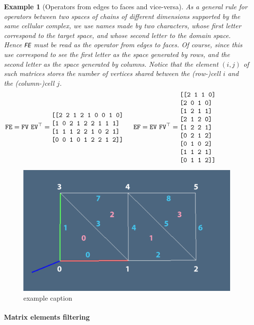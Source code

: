 \documentclass[11pt,oneside]{article}    %
\newtheorem{example}{Example}
\begin{document}
\begin{example}[Operators from edges to faces and vice-versa]\label{ex:denseMat}
As a general rule for operators between two spaces of chains of different dimensions supported by the \emph{same} cellular complex, we use names made by two characters, whose first letter correspond to the target space, and whose second letter to the domain space. Hence \texttt{FE} must be read as the operator from edges to faces. Of course, since this use correspond to see the first letter as the space generated by rows, and the second letter as the space generated by columns. Notice that the element $(i,j)$ of such matrices stores the number of vertices shared between the (row-)cell $i$ and the (column-)cell $j$.
\[
\texttt{FE} = \texttt{FV}\ \texttt{EV}^\top = 
\begin{minipage}[c]{0.29\linewidth}
\begin{verbatim}
[[2 2 1 2 1 0 0 1 0]
 [1 0 2 1 2 2 1 1 1]
 [1 1 1 2 2 1 0 2 1]
 [0 0 1 0 1 2 2 1 2]]
\end{verbatim}
\end{minipage}
\qquad
\texttt{EF} = \texttt{EV}\ \texttt{FV}^\top = 
\begin{minipage}[c]{0.29\linewidth}
\begin{verbatim}
[[2 1 1 0]
 [2 0 1 0]
 [1 2 1 1]
 [2 1 2 0]
 [1 2 2 1]
 [0 2 1 2]
 [0 1 0 2]
 [1 1 2 1]
 [0 1 1 2]]
\end{verbatim}
\end{minipage}
\]
\end{example}

\begin{figure}[htbp] %
   \centering
   \includegraphics[width=0.6\linewidth]{images/2complex} 
   \caption{example caption}
   \label{fig:2complex}
\end{figure}

\paragraph{Matrix elements filtering}
\end{document}

